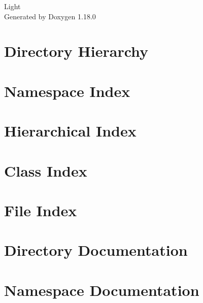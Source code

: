 \documentclass[twoside]{book}
\newcommand{\+}{\discretionary{\mbox{\scriptsize$\hookleftarrow$}}{}{}}
\newcommand{\clearemptydoublepage}{%
    \newpage{\pagestyle{empty}\cleardoublepage}%
  }
\begin{document}
  \raggedbottom
    \hypersetup{pageanchor=false,
                bookmarksnumbered=true,
                pdfencoding=unicode
               }
  \begin{titlepage}
  \vspace*{7cm}
  \begin{center}%
  {\Large Light}\\
  \vspace*{1cm}
  {\large Generated by Doxygen 1.18.0}\\
  \end{center}
  \end{titlepage}
  \clearemptydoublepage
  \tableofcontents
  \clearemptydoublepage
  \hypersetup{pageanchor=true}
\chapter{Directory Hierarchy}

\chapter{Namespace Index}

\chapter{Hierarchical Index}

\chapter{Class Index}

\chapter{File Index}

\chapter{Directory Documentation}


\chapter{Namespace Documentation}



\end{document}
